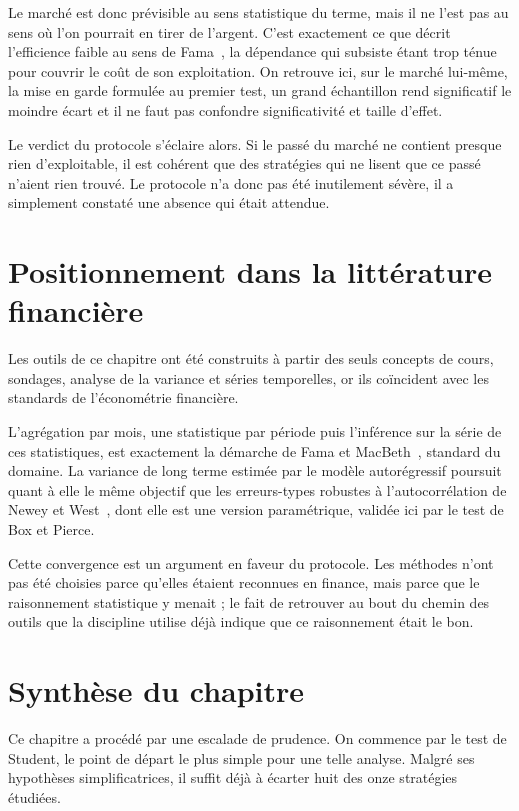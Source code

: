 Le marché est donc prévisible au sens statistique du terme, mais il ne l'est
pas au sens où l'on pourrait en tirer de l'argent. C'est exactement ce que
décrit l'efficience faible au sens de Fama~\cite{fama1970}, la dépendance qui
subsiste étant trop ténue pour couvrir le coût de son exploitation. On retrouve ici, sur le marché
lui-même, la mise en garde formulée au premier test, un grand échantillon rend
significatif le moindre écart et il ne faut pas confondre significativité et
taille d'effet.

Le verdict du protocole s'éclaire alors. Si le passé du marché ne contient
presque rien d'exploitable, il est cohérent que des stratégies qui ne lisent
que ce passé n'aient rien trouvé. Le protocole n'a donc pas été
inutilement sévère, il a simplement constaté une absence qui était
attendue.

\section{Positionnement dans la littérature financière}
\label{sec:b1-positionnement}

Les outils de ce chapitre ont été construits à partir des seuls concepts de
cours, sondages, analyse de la variance et séries temporelles, or ils
coïncident avec les standards de l'économétrie financière.

L'agrégation par mois, une statistique par période puis l'inférence sur la
série de ces statistiques, est exactement la démarche de Fama et
MacBeth~\cite{famamacbeth1973}, standard du domaine. La variance de long terme
estimée par le modèle autorégressif poursuit quant à elle le même objectif que
les erreurs-types robustes à l'autocorrélation de Newey et
West~\cite{neweywest1987}, dont elle est une version paramétrique, validée ici
par le test de Box et Pierce.

Cette convergence est un argument en faveur du protocole. Les méthodes n'ont
pas été choisies parce qu'elles étaient reconnues en finance, mais parce que
le raisonnement statistique y menait ; le fait de retrouver au bout du chemin
des outils que la discipline utilise déjà indique que ce raisonnement était le
bon.

\section{Synthèse du chapitre}
\label{sec:b1-synthese}
Ce chapitre a procédé par une escalade de prudence. On commence par le test
de Student, le point de départ le plus simple pour une telle analyse. Malgré
ses hypothèses simplificatrices, il suffit déjà à écarter huit des onze
stratégies étudiées.

